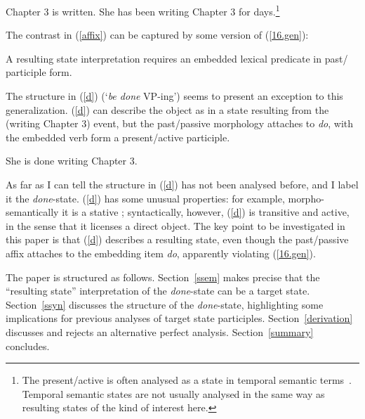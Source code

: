 \documentclass[output=paper]{langsci/langscibook}
\begin{document}
\begin{exe}
\ex\label{affix}
    \begin{xlist}
    \ex Chapter 3 is written.
    \ex She has been writing Chapter 3 for days.\footnote{The present/active is often analysed as a state in temporal semantic terms~\citep[e.g.\ ][]{Parsons1990a}. Temporal semantic states are not usually analysed in the same way as resulting states of the kind of interest here.}
    \end{xlist}
\end{exe}

The contrast in (\ref{affix}) can be captured by some version of (\ref{16.gen}):

\begin{exe}
\ex\label{16.gen}  A resulting state interpretation requires an embedded lexical predicate in past\slash{} participle form.
\end{exe}

The structure in (\ref{d}) (`\emph{be done} VP-ing') seems to present an
exception to this generalization. (\ref{d}) can describe the object as in a
state resulting from the (writing Chapter 3) event, but the past\slash passive
morphology attaches to \emph{do}, with the embedded verb form a present\slash active
participle.

\begin{exe}
\ex\label{d} She is done writing Chapter 3.
\end{exe}

As far as I can tell the structure in (\ref{d})  has not been analysed before,
and I label it the \emph{done}-state. (\ref{d}) has some unusual properties:
for example, morpho-semantically it is a stative ; syntactically,
however, (\ref{d}) is transitive and active, in the sense that it licenses a
direct object. The key point to be investigated in this paper is that (\ref{d})
describes a resulting state, even though the past/passive affix attaches to the
embedding item \emph{do}, apparently violating (\ref{16.gen}).

The paper is structured as follows. Section~\ref{ssem} makes precise that the
\enquote{resulting state} interpretation of the \emph{done}-state can be a
target state. Section~\ref{ssyn} discusses the structure of the
\emph{done}-state, highlighting some implications for previous analyses of
target state participles. Section~\ref{derivation} discusses and rejects an
alternative perfect analysis. Section~\ref{summary} concludes.
\end{document}
